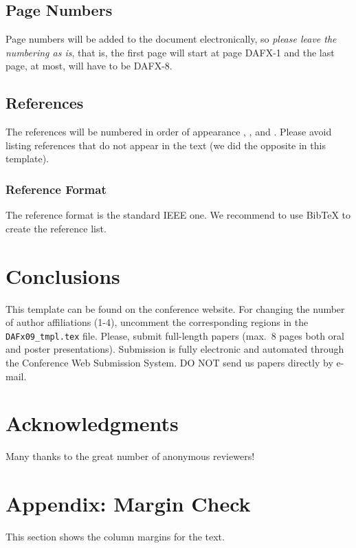 \documentclass[twoside,a4paper]{article}
\begin{document}
\subsection{Page Numbers}

Page numbers will be added to the document electronically, so {\em
  please leave the numbering as is}, that is, the first page will
start at page DAFX-1 and the last page, at most, will have to be
DAFX-8.

\subsection{References}

The references will be numbered in order of appearance
\cite{Mitra:Kaiser:1993:DSP:handbook},
\cite{Haykin:1991:adaptive:filter},
\cite{Moorer:2000:AES:audio:millenium} and
\cite{Nackaerts:2001:ICMC}. Please avoid listing references that do
not appear in the text (we did the opposite in this template).

\subsubsection{Reference Format}

The reference format is the standard IEEE one. We recommend to use
BibTeX to create the reference list.

\section{Conclusions}

This template can be found on the conference website.  For changing
the number of author affiliations (1-4), uncomment the corresponding
regions in the \texttt{DAFx09\_tmpl.tex} file.  Please, submit
full-length papers (max.~8 pages both oral and poster presentations).
Submission is fully electronic and automated through the Conference
Web Submission System.  DO NOT send us papers directly by e-mail.

\section{Acknowledgments}
Many thanks to the great number of anonymous reviewers!

\nocite{*}


\section{Appendix: Margin Check}
This section shows the column margins for the text. \bigskip\newline
\end{document}
